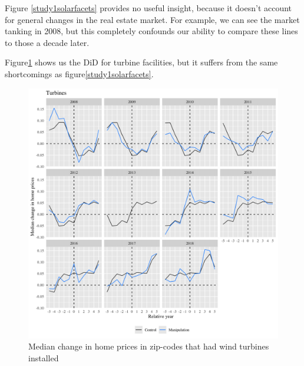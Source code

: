 \documentclass{article}
\begin{document}
Figure \ref{study1solarfacets} provides no useful insight, because it doesn't account for general changes in the real estate market.
For example, we can see the market tanking in 2008, but this completely confounds our ability to compare these lines to those a decade later.

Figure\ref{study1turbinefacets} shows us the DiD for turbine facilities, but it suffers from the same shortcomings as figure\ref{study1solarfacets}.
\begin{figure}[h]
\centering
\includegraphics[width=0.9\linewidth]
{study1_turbine_facets.png} 
\caption{Median change in home prices in zip-codes that had wind turbines installed}
\label{study1turbinefacets}
\end{figure}
\end{document}
